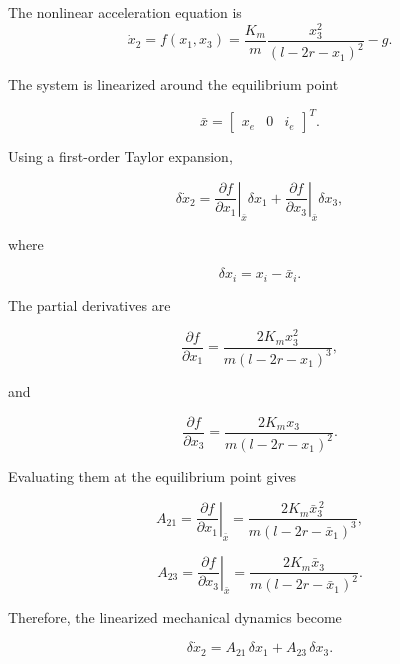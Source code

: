 The nonlinear acceleration equation is
\[
\dot{x}_2 =
f(x_1,x_3)
=
\frac{K_m}{m}
\frac{x_3^2}
{\left(l-2r-x_1\right)^2}
-g.
\]

The system is linearized around the equilibrium point

\begin{equation}
\bar{x}=
\begin{bmatrix}
x_e &
0 &
i_e
\end{bmatrix}^{T}.
\end{equation}

Using a first-order Taylor expansion,

\begin{equation}
\delta\dot{x}_2
=
\left.\frac{\partial f}{\partial x_1}\right|_{\bar{x}}
\delta x_1
+
\left.\frac{\partial f}{\partial x_3}\right|_{\bar{x}}
\delta x_3 ,
\end{equation}

where

\begin{equation}
\delta x_i = x_i-\bar{x}_i.
\end{equation}

The partial derivatives are

\begin{equation}
\frac{\partial f}{\partial x_1}
=
\frac{2K_m x_3^2}
{m\left(l-2r-x_1\right)^3},
\end{equation}

and

\begin{equation}
\frac{\partial f}{\partial x_3}
=
\frac{2K_m x_3}
{m\left(l-2r-x_1\right)^2}.
\end{equation}

Evaluating them at the equilibrium point gives

\begin{equation}
A_{21}
=
\left.\frac{\partial f}{\partial x_1}\right|_{\bar{x}}
=
\frac{2K_m \bar{x}_3^{\,2}}
{m\left(l-2r-\bar{x}_1\right)^3},
\end{equation}

\begin{equation}
A_{23}
=
\left.\frac{\partial f}{\partial x_3}\right|_{\bar{x}}
=
\frac{2K_m \bar{x}_3}
{m\left(l-2r-\bar{x}_1\right)^2}.
\end{equation}

Therefore, the linearized mechanical dynamics become

\begin{equation}
\delta\dot{x}_2
=
A_{21}\,\delta x_1
+
A_{23}\,\delta x_3.
\end{equation}

